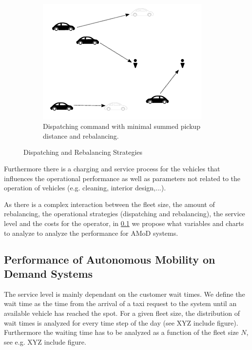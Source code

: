\begin{figure}[h]
\begin{subfigure}[b]{0.3\textwidth}
    \end{subfigure}
    ~ %
    \begin{subfigure}[b]{0.3\textwidth}
        \includegraphics[width=\textwidth]{figures/RebalancingRedispatching3}
        \caption{Dispatching command with minimal summed pickup distance and rebalancing.}
        \label{fig:dispatch-optreb}
    \end{subfigure}
    \caption{Dispatching and Rebalancing Strategies}\label{fig:animals}
\end{figure}


Furthermore there is a charging and service process for the vehicles that influences the operational performance as well as parameters not related to the operation of vehicles (e.g. cleaning, interior design,...).

As there is a complex interaction between the fleet size, the amount of rebalancing, the operational strategies (dispatching and rebalancing), the service level and the costs for the operator, in \ref{subsec:performancemeasures} we propose what variables and charts to analyze to analyze the performance for AMoD systems.



\subsection{Performance of Autonomous Mobility on Demand Systems}
\label{subsec:performancemeasures}

The service level is mainly dependant on the customer wait times. We define the wait time as the time from the arrival of a taxi request to the system until an available vehicle has reached the spot. For a given fleet size, the distribution of wait times is analyzed for every time step of the day (see XYZ include figure). Furthermore the waiting time has to be analyzed as a function of the fleet size $N$, see e.g. XYZ include figure.

